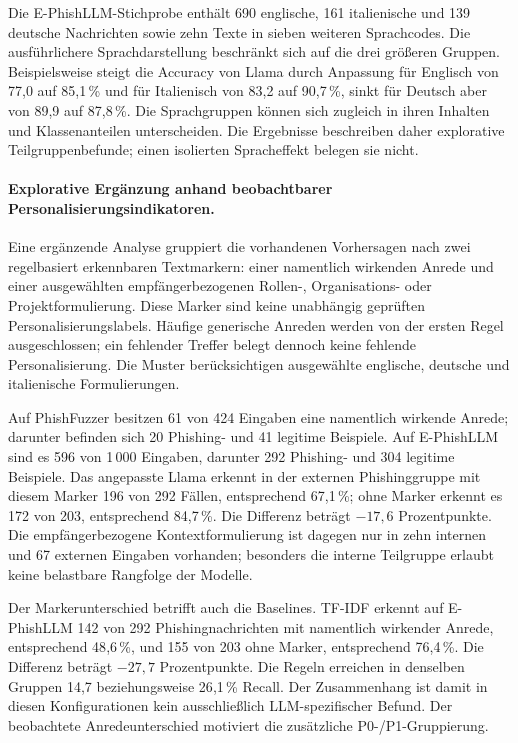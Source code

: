 \documentclass[12pt,twoside=false,a4paper,parskip]{scrbook}
\begin{document}
Die E-PhishLLM-Stichprobe enthält 690 englische, 161 italienische und 139 deutsche Nachrichten sowie zehn Texte in sieben weiteren Sprachcodes. Die ausführlichere Sprachdarstellung beschränkt sich auf die drei größeren Gruppen. Beispielsweise steigt die Accuracy von Llama durch Anpassung für Englisch von 77{,}0 auf 85{,}1\,\% und für Italienisch von 83{,}2 auf 90{,}7\,\%, sinkt für Deutsch aber von 89{,}9 auf 87{,}8\,\%. Die Sprachgruppen können sich zugleich in ihren Inhalten und Klassenanteilen unterscheiden. Die Ergebnisse beschreiben daher explorative Teilgruppenbefunde; einen isolierten Spracheffekt belegen sie nicht.

\paragraph{Explorative Ergänzung anhand beobachtbarer Personalisierungsindikatoren.}
Eine ergänzende Analyse gruppiert die vorhandenen Vorhersagen nach zwei regelbasiert erkennbaren Textmarkern: einer namentlich wirkenden Anrede und einer ausgewählten empfängerbezogenen Rollen-, Organisations- oder Projektformulierung. Diese Marker sind keine unabhängig geprüften Personalisierungslabels. Häufige generische Anreden werden von der ersten Regel ausgeschlossen; ein fehlender Treffer belegt dennoch keine fehlende Personalisierung. Die Muster berücksichtigen ausgewählte englische, deutsche und italienische Formulierungen.

Auf PhishFuzzer besitzen 61 von 424 Eingaben eine namentlich wirkende Anrede; darunter befinden sich 20 Phishing- und 41 legitime Beispiele. Auf E-PhishLLM sind es 596 von 1\,000 Eingaben, darunter 292 Phishing- und 304 legitime Beispiele. Das angepasste Llama erkennt in der externen Phishinggruppe mit diesem Marker 196 von 292 Fällen, entsprechend 67{,}1\,\%; ohne Marker erkennt es 172 von 203, entsprechend 84{,}7\,\%. Die Differenz beträgt $-17{,}6$ Prozentpunkte. Die empfängerbezogene Kontextformulierung ist dagegen nur in zehn internen und 67 externen Eingaben vorhanden; besonders die interne Teilgruppe erlaubt keine belastbare Rangfolge der Modelle.

Der Markerunterschied betrifft auch die Baselines. TF-IDF erkennt auf E-PhishLLM 142 von 292 Phishingnachrichten mit namentlich wirkender Anrede, entsprechend 48{,}6\,\%, und 155 von 203 ohne Marker, entsprechend 76{,}4\,\%. Die Differenz beträgt $-27{,}7$ Prozentpunkte. Die Regeln erreichen in denselben Gruppen 14{,}7 beziehungsweise 26{,}1\,\% Recall. Der Zusammenhang ist damit in diesen Konfigurationen kein ausschließlich LLM-spezifischer Befund. Der beobachtete Anredeunterschied motiviert die zusätzliche P0-/P1-Gruppierung.
\end{document}
